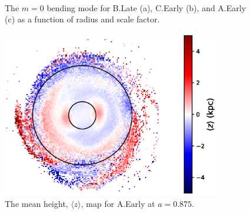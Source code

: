 \begin{figure}
	\centering
	\\
\caption{The $m=0$ bending mode for B.Late (a), C.Early (b), and
  A.Early (c) as a function of radius and scale factor. }\label{fig:bendingm0}
\end{figure}

\begin{figure}
	\centering
	\includegraphics[width=0.85\textwidth]{../figures/a_early_displacement_a_0_875.eps}
	\caption{The mean height, $\langle z \rangle$, map for A.Early at $a=0.875$.}\label{fig:a_early_displacement}
\end{figure}

